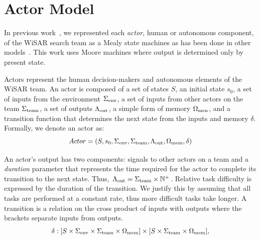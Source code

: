 \section{Actor Model} 

In previous work~\cite{gledhill2013modelinguas}, we represented each {\em actor}, human or autonomous component, of the WiSAR search team as a Mealy state machines as has been done in other models~\cite{bolton2013litreview}. This work uses Moore machines where output is determined only by present state.

Actors represent the human decision-makers and autonomous elements of the WiSAR team.  An actor is composed of a set of states $S$, an initial state $s_0$, a set of inputs from the environment $\Sigma_{\rm env}$, a set of inputs from other actors on the team $\Sigma_{\rm team}$, a set of outputs $\Lambda_{\rm out}$, a simple form of memory $\Omega_{\rm men}$, and a transition function that determines the next state from the inputs and memory $\delta$. Formally, we denote an actor as:
\begin{equation}
 	Actor = (S, s_0, \Sigma_{\rm env}, \Sigma_{\rm team}, \Lambda_{\rm out}, \Omega_{\rm mem},\delta)
 \label{eq:actor}
 \end{equation}

 An actor's output has two components: signals to other actors on a team and a {\em duration} parameter that represents the time required for the actor to complete its transition to the next state.  Thus, $\Lambda_{\rm out}=\Sigma_{\rm team} \times \mathbb{N}^+$.
Relative task difficulty is expressed by the duration of the transition.
We justify this by assuming that all tasks are performed at a constant rate, thus more difficult tasks take longer.
 A transition is a relation on the cross product of inputs with outputs where the brackets separate inputs from outputs.
\begin{equation}
 \delta:[S\times\Sigma_{\rm env}\times\Sigma_{\rm team}\times\Omega_{\rm mem}] \times [S\times \Sigma_{\rm team} \times \Omega_{\rm mem}], 
\end{equation} 
 
